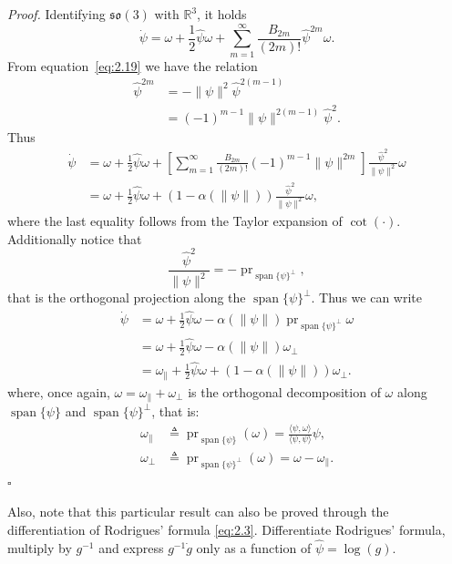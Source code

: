 \documentclass[11pt]{article}
\newcommand{\so}{\mathfrak{so}}
\newcommand{\pr}{\operatorname{pr}}
\newcommand{\R}{\mathbb R}
\newcommand{\proofbox}{\hfill$\square$}
\begin{document}
\emph{Proof.} Identifying $\so(3)$ with $\R^3$, it holds
\begin{equation*}
\dot\psi=\omega+\frac12\widehat\psi\omega+\sum_{m=1}^{\infty}\frac{B_{2m}}{(2m)!}\widehat\psi^{2m}\omega.
\end{equation*}
From equation~\eqref{eq:2.19} we have the relation
\begin{align*}
\widehat\psi^{2m}&=-\|\psi\|^2\widehat\psi^{2(m-1)}\\
&=(-1)^{m-1}\|\psi\|^{2(m-1)}\widehat\psi^2.
\end{align*}
Thus
\begin{align*}
\dot\psi
&=\omega+\frac12\widehat\psi\omega+
\left[\sum_{m=1}^{\infty}\frac{B_{2m}}{(2m)!}(-1)^{m-1}\|\psi\|^{2m}\right]
\frac{\widehat\psi^2}{\|\psi\|^2}\omega\\
&=\omega+\frac12\widehat\psi\omega+(1-\alpha(\|\psi\|))\frac{\widehat\psi^2}{\|\psi\|^2}\omega,
\end{align*}
where the last equality follows from the Taylor expansion of $\cot(\cdot)$. Additionally notice that
\begin{equation*}
\frac{\widehat\psi^2}{\|\psi\|^2}=-\pr_{\operatorname{span}\{\psi\}^{\perp}},
\end{equation*}
that is the orthogonal projection along the $\operatorname{span}\{\psi\}^{\perp}$. Thus we can write
\begin{align*}
\dot\psi&=\omega+\frac12\widehat\psi\omega-\alpha(\|\psi\|)\pr_{\operatorname{span}\{\psi\}^{\perp}}\omega\\
&=\omega+\frac12\widehat\psi\omega-\alpha(\|\psi\|)\omega_{\perp}\\
&=\omega_{\parallel}+\frac12\widehat\psi\omega+(1-\alpha(\|\psi\|))\omega_{\perp}.
\end{align*}
where, once again, $\omega=\omega_{\parallel}+\omega_{\perp}$ is the orthogonal decomposition of $\omega$ along $\operatorname{span}\{\psi\}$ and $\operatorname{span}\{\psi\}^{\perp}$, that is:
\begin{align*}
\omega_{\parallel}&\triangleq\pr_{\operatorname{span}\{\psi\}}(\omega)=\frac{\langle\psi,\omega\rangle}{\langle\psi,\psi\rangle}\psi,\\
\omega_{\perp}&\triangleq\pr_{\operatorname{span}\{\psi\}^{\perp}}(\omega)=\omega-\omega_{\parallel}.
\end{align*}
\proofbox

Also, note that this particular result can also be proved through the differentiation of Rodrigues' formula \eqref{eq:2.3}. Differentiate Rodrigues' formula, multiply by $g^{-1}$ and express $g^{-1}\dot g$ only as a function of $\widehat\psi=\log(g)$.
\end{document}

